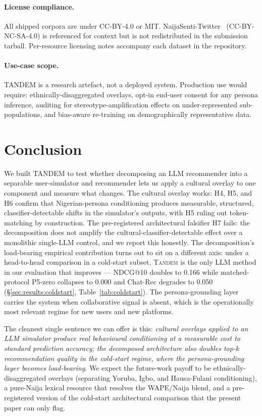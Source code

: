 \documentclass[8pt,twocolumn,a4paper]{extarticle}
\begin{document}
\paragraph{License compliance.}
All shipped corpora are under CC-BY-4.0 or MIT. NaijaSenti-Twitter~\citep{muhammad2022naijasenti} (CC-BY-NC-SA-4.0) is referenced for context but is not redistributed in the submission tarball. Per-resource licensing notes accompany each dataset in the repository.

\paragraph{Use-case scope.}
TANDEM is a research artefact, not a deployed system. Production use would require: ethnically-disaggregated overlays, opt-in end-user consent for any persona inference, auditing for stereotype-amplification effects on under-represented sub-populations, and bias-aware re-training on demographically representative data.

\section{Conclusion}
\label{sec:conclusion}

We built TANDEM to test whether decomposing an LLM recommender into a separable user-simulator and recommender lets us apply a cultural overlay to one component and measure what changes. The cultural overlay works: H4, H5, and H6 confirm that Nigerian-persona conditioning produces measurable, structured, classifier-detectable shifts in the simulator's outputs, with H5 ruling out token-matching by construction. The pre-registered architectural falsifier H7 fails: the decomposition does not amplify the cultural-classifier-detectable effect over a monolithic single-LLM control, and we report this honestly. The decomposition's load-bearing empirical contribution turns out to sit on a different axis: under a head-to-head comparison in a cold-start subset, \textsc{Tandem} is the only LLM method in our evaluation that improves --- NDCG@10 doubles to 0.166 while matched-protocol P5-zero collapses to 0.000 and Chat-Rec degrades to 0.050 (\S\ref{sec:results:coldstart}, Table~\ref{tab:coldstart}). The persona-grounding layer carries the system when collaborative signal is absent, which is the operationally most relevant regime for new users and new platforms.

The cleanest single sentence we can offer is this: \emph{cultural overlays applied to an LLM simulator produce real behavioural conditioning at a measurable cost to standard prediction accuracy; the decomposed architecture also doubles top-$k$ recommendation quality in the cold-start regime, where the persona-grounding layer becomes load-bearing}. We expect the future-work payoff to be ethnically-disaggregated overlays (separating Yoruba, Igbo, and Hausa-Fulani conditioning), a pure-Naija lexical resource that resolves the WAPE/Naija blend, and a pre-registered version of the cold-start architectural comparison that the present paper can only flag.
\end{document}
